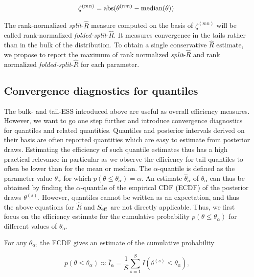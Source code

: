 \documentclass[american,]{article}
\begin{document}
\begin{equation}
\label{zeta}
\zeta^{(mn)} = {\rm abs}(\theta^{(nm)}-{\rm median}(\theta)).
\end{equation}

The rank-normalized \emph{split}-\(\widehat{R}\) measure computed on the
basis of \(\zeta^{(mn)}\) will be called rank-normalized
\emph{folded-split}-\(\widehat{R}\). It measures convergence in the
tails rather than in the bulk of the distribution. To obtain a single
conservative \(\widehat{R}\) estimate, we propose to report the maximum
of rank normalized \emph{split}-\(\widehat{R}\) and rank normalized
\emph{folded-split}-\(\widehat{R}\) for each parameter.

\hypertarget{convergence-diagnostics-for-quantiles}{%
\subsection{Convergence diagnostics for
quantiles}\label{convergence-diagnostics-for-quantiles}}

The bulk- and tail-ESS introduced above are useful as overall efficiency
measures. However, we want to go one step further and introduce
convergence diagnostics for quantiles and related quantities. Quantiles
and posterior intervals derived on their basis are often reported
quantities which are easy to estimate from posterior draws. Estimating
the efficiency of such quantile estimates thus has a high practical
relevance in particular as we observe the efficiency for tail quantiles
to often be lower than for the mean or median. The \(\alpha\)-quantile
is defined as the parameter value \(\theta_\alpha\) for which
\(p(\theta \leq \theta_\alpha) = \alpha\). An estimate
\(\hat{\theta}_\alpha\) of \(\theta_\alpha\) can thus be obtained by
finding the \(\alpha\)-quantile of the empirical CDF (ECDF) of the
posterior draws \(\theta^{(s)}\). However, quantiles cannot be written
as an expectation, and thus the above equations for \(\widehat{R}\) and
\(S_{\rm eff}\) are not directly applicable. Thus, we first focus on the
efficiency estimate for the cumulative probability
\(p(\theta \leq \theta_\alpha)\) for different values of
\(\theta_\alpha\).

For any \(\theta_\alpha\), the ECDF gives an estimate of the cumulative
probability

\begin{equation}
p(\theta \leq \theta_\alpha) \approx \bar{I}_\alpha = \frac{1}{S}\sum_{s=1}^S
I(\theta^{(s)} \leq\theta_\alpha),
\end{equation}
\end{document}
